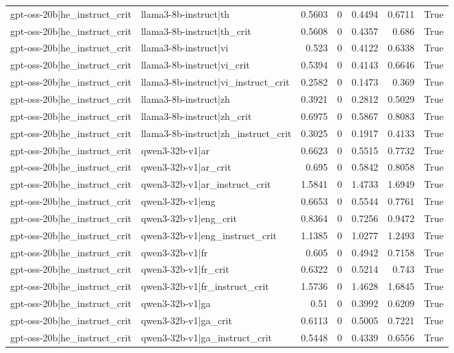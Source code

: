 \begin{table}
\begin{tabular}{l l r r r r l}
gpt-oss-20b|he_instruct_crit & llama3-8b-instruct|th & 0.5603 & 0 & 0.4494 & 0.6711 & True \\
gpt-oss-20b|he_instruct_crit & llama3-8b-instruct|th_crit & 0.5608 & 0 & 0.4357 & 0.686 & True \\
gpt-oss-20b|he_instruct_crit & llama3-8b-instruct|vi & 0.523 & 0 & 0.4122 & 0.6338 & True \\
gpt-oss-20b|he_instruct_crit & llama3-8b-instruct|vi_crit & 0.5394 & 0 & 0.4143 & 0.6646 & True \\
gpt-oss-20b|he_instruct_crit & llama3-8b-instruct|vi_instruct_crit & 0.2582 & 0 & 0.1473 & 0.369 & True \\
gpt-oss-20b|he_instruct_crit & llama3-8b-instruct|zh & 0.3921 & 0 & 0.2812 & 0.5029 & True \\
gpt-oss-20b|he_instruct_crit & llama3-8b-instruct|zh_crit & 0.6975 & 0 & 0.5867 & 0.8083 & True \\
gpt-oss-20b|he_instruct_crit & llama3-8b-instruct|zh_instruct_crit & 0.3025 & 0 & 0.1917 & 0.4133 & True \\
gpt-oss-20b|he_instruct_crit & qwen3-32b-v1|ar & 0.6623 & 0 & 0.5515 & 0.7732 & True \\
gpt-oss-20b|he_instruct_crit & qwen3-32b-v1|ar_crit & 0.695 & 0 & 0.5842 & 0.8058 & True \\
gpt-oss-20b|he_instruct_crit & qwen3-32b-v1|ar_instruct_crit & 1.5841 & 0 & 1.4733 & 1.6949 & True \\
gpt-oss-20b|he_instruct_crit & qwen3-32b-v1|eng & 0.6653 & 0 & 0.5544 & 0.7761 & True \\
gpt-oss-20b|he_instruct_crit & qwen3-32b-v1|eng_crit & 0.8364 & 0 & 0.7256 & 0.9472 & True \\
gpt-oss-20b|he_instruct_crit & qwen3-32b-v1|eng_instruct_crit & 1.1385 & 0 & 1.0277 & 1.2493 & True \\
gpt-oss-20b|he_instruct_crit & qwen3-32b-v1|fr & 0.605 & 0 & 0.4942 & 0.7158 & True \\
gpt-oss-20b|he_instruct_crit & qwen3-32b-v1|fr_crit & 0.6322 & 0 & 0.5214 & 0.743 & True \\
gpt-oss-20b|he_instruct_crit & qwen3-32b-v1|fr_instruct_crit & 1.5736 & 0 & 1.4628 & 1.6845 & True \\
gpt-oss-20b|he_instruct_crit & qwen3-32b-v1|ga & 0.51 & 0 & 0.3992 & 0.6209 & True \\
gpt-oss-20b|he_instruct_crit & qwen3-32b-v1|ga_crit & 0.6113 & 0 & 0.5005 & 0.7221 & True \\
gpt-oss-20b|he_instruct_crit & qwen3-32b-v1|ga_instruct_crit & 0.5448 & 0 & 0.4339 & 0.6556 & True \\

\end{tabular}
\end{table}
